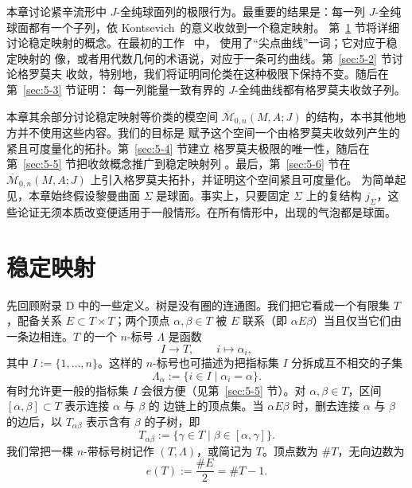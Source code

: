 
本章讨论紧辛流形中 $J$-全纯球面列的极限行为。最重要的结果是：每一列
$J$-全纯球面都有一个子列，依 Kontsevich\, 的意义收敛到一个稳定映射。
第~\ref{sec:5-1} 节将详细讨论稳定映射的概念。在最初的工作~ 中，
使用了“尖点曲线”一词；它对应于稳定映射的
像，或者用代数几何的术语说，对应于一条可约曲线。第~\ref{sec:5-2} 节讨论格罗莫夫
收敛，特别地，我们将证明同伦类在这种极限下保持不变。随后在第~\ref{sec:5-3} 节证明：
每一列能量一致有界的 $J$-全纯曲线都有格罗莫夫收敛子列。

本章其余部分讨论稳定映射等价类的模空间
$\overline{\mathcal M}_{0,n}(M,A;J)$ 的结构，本书其他地方并不使用这些内容。我们的目标是
赋予这个空间一个由格罗莫夫收敛列产生的紧且可度量化的拓扑。第~\ref{sec:5-4} 节建立
格罗莫夫极限的唯一性，随后在第~\ref{sec:5-5} 节把收敛概念推广到稳定映射列
。最后，第~\ref{sec:5-6} 节在
$\overline{\mathcal M}_{0,n}(M,A;J)$ 上引入格罗莫夫拓扑，并证明这个空间紧且可度量化。
为简单起见，本章始终假设黎曼曲面 $\Sigma$ 是球面。事实上，只要固定 $\Sigma$ 上的复结构
$j_\Sigma$，这些论证无须本质改变便适用于一般情形。在所有情形中，出现的气泡都是球面。

\section{稳定映射}\label{sec:5-1}

先回顾附录 D 中的一些定义。树是没有圈的连通图。我们把它看成一个有限集 $T$，配备关系
$E\subset T\times T$；两个顶点 $\alpha,\beta\in T$ 被 $E$ 联系（即
$\alpha E\beta$）当且仅当它们由一条边相连。$T$ 的一个 $n$-标号 $\Lambda$ 是函数
\[
  I\longrightarrow T,
  \qquad i\longmapsto\alpha_i,
\]
其中 $I:=\{1,\ldots,n\}$。这样的 $n$-标号也可描述为把指标集 $I$ 分拆成互不相交的子集
\[
  \Lambda_\alpha:=\{i\in I\mid\alpha_i=\alpha\}.
\]
有时允许更一般的指标集 $I$ 会很方便（见第~\ref{sec:5-5} 节）。对
$\alpha,\beta\in T$，区间 $[\alpha,\beta]\subset T$ 表示连接 $\alpha$ 与 $\beta$ 的
边链上的顶点集。当 $\alpha E\beta$ 时，删去连接 $\alpha$ 与 $\beta$ 的边后，以
$T_{\alpha\beta}$ 表示含有 $\beta$ 的子树，即
\[
  T_{\alpha\beta}:=\{\gamma\in T\mid\beta\in[\alpha,\gamma]\}.
\]
我们常把一棵 $n$-带标号树记作 $(T,\Lambda)$，或简记为 $T$。顶点数为 $\#T$，无向边数为
\[
  e(T):=\frac{\#E}{2}=\#T-1.
\]

